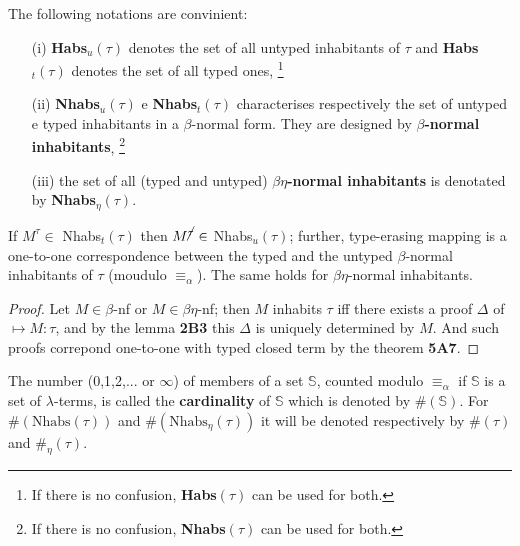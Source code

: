 \documentclass[a4paper,10pt]{article}
\begin{document}
\begin{notation} The following notations are convinient:
\begin{itemize} 
 \item[(i)] \textbf{Habs$_u(\tau)$} denotes the set of all untyped inhabitants of $\tau$ and \textbf{Habs$_t(\tau)$} denotes the set of all typed ones,
 \footnote{If there is no confusion, \textbf{Habs$(\tau)$} can be used for both.}
 \item[(ii)] \textbf{Nhabs$_u(\tau)$} e \textbf{Nhabs$_t(\tau)$} characterises respectively the set of untyped e typed inhabitants in a $\beta$-normal form. They are designed by \textbf{$\beta$-normal inhabitants}, 
 \footnote{If there is no confusion, \textbf{Nhabs$(\tau)$} can be used for both.}
 \item[(iii)] the set of all (typed and untyped) $\beta\eta$\textbf{-normal inhabitants} is denotated by \textbf{Nhabs$_{\eta}(\tau)$}.
\end{itemize}
\end{notation}

\begin{lem} \label{8A2}
 If $M^{\tau} \in$ Nhabs$_t(\tau)$ then $M^{\cancel{\tau}} \in$ Nhabs$_u(\tau)$; further, type-erasing mapping is a one-to-one correspondence between the typed 
 and the untyped $\beta$-normal inhabitants of $\tau$ (moudulo $\equiv_{\alpha}$). The same holds for $\beta\eta$-normal inhabitants.

 \begin{proof}
 Let $M \in \beta$-nf or $M \in \beta\eta$-nf; then $M$ inhabits $\tau$ iff there exists a proof $\Delta$ of $\mapsto M : \tau$, and by the lemma \textbf{2B3}
 this $\Delta$ is uniquely determined by $M$. And such proofs correpond one-to-one with typed closed term by the theorem \textbf{5A7}.
 \end{proof}
\end{lem}

\begin{mydef}
 The number (0,1,2,... or $\infty$) of members of a set $\mathbb{S}$, counted modulo $\equiv_{\alpha}$ if $\mathbb{S}$ is a set of
 $\lambda$-terms, is called the \textbf{cardinality} of $\mathbb{S}$ which is denoted by $\#(\mathbb{S})$. 
 For $\#(\mbox{Nhabs}(\tau))$ and $\#(\mbox{Nhabs}_{\eta}(\tau))$ it will be denoted respectively by $\#(\tau)$ and $\#_{\eta}(\tau)$.
\end{mydef}
\end{document}
